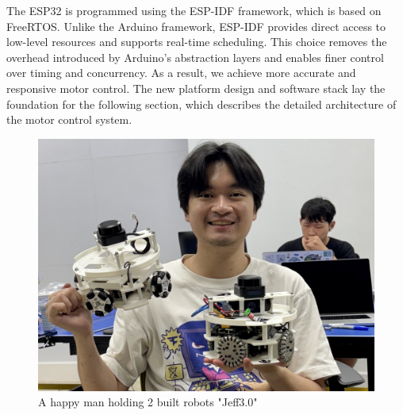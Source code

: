         The ESP32 is programmed using the ESP-IDF framework, which is based on FreeRTOS. Unlike the Arduino framework, ESP-IDF provides direct access to low-level resources and supports real-time scheduling. This choice removes the overhead introduced by Arduino’s abstraction layers and enables finer control over timing and concurrency. As a result, we achieve more accurate and responsive motor control.
The new platform design and software stack lay the foundation for the following section, which describes the detailed architecture of the motor control system.  
\begin{figure} [H]
    \centering
    \includegraphics[width=0.65\linewidth]{assets/images/hardware/IMG_8290.jpeg}
    \caption{A happy man holding 2 built robots "Jeff3.0"}
    \label{fig:have2robots}
\end{figure}



